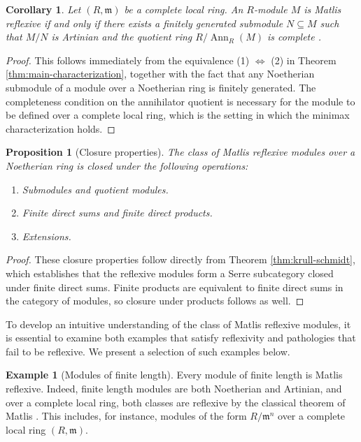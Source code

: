 \documentclass{kms-c}
\theoremstyle{plain}
\newtheorem{proposition}[theorem]{Proposition}
\newtheorem{corollary}[theorem]{Corollary}
\theoremstyle{definition}
\newtheorem{example}[theorem]{Example}
\theoremstyle{remark}
\begin{document}
\begin{corollary}
\label{cor:main}
Let \( (R, \mathfrak{m}) \) be a complete local ring. An \( R \)-module \( M \) is Matlis reflexive if and only if there exists a finitely generated submodule \( N \subseteq M \) such that \( M/N \) is Artinian and the quotient ring \( R/\operatorname{Ann}_R(M) \) is complete \cite[Theorem 3.1]{Matlis1958}.
\end{corollary}
\begin{proof}
This follows immediately from the equivalence (1) \(\Leftrightarrow\) (2) in Theorem \ref{thm:main-characterization}, together with the fact that any Noetherian submodule of a module over a Noetherian ring is finitely generated. The completeness condition on the annihilator quotient is necessary for the module to be defined over a complete local ring, which is the setting in which the minimax characterization holds. 
\end{proof}

\begin{proposition}[Closure properties]
\label{prop:closure}
The class of Matlis reflexive modules over a Noetherian ring is closed under the following operations:
\begin{enumerate}
\item Submodules and quotient modules.
\item Finite direct sums and finite direct products.
\item Extensions.
\end{enumerate}
\end{proposition}
\begin{proof}
These closure properties follow directly from Theorem \ref{thm:krull-schmidt}, which establishes that the reflexive modules form a Serre subcategory closed under finite direct sums. Finite products are equivalent to finite direct sums in the category of modules, so closure under products follows as well. 
\end{proof}

To develop an intuitive understanding of the class of Matlis reflexive modules, it is essential to examine both examples that satisfy reflexivity and pathologies that fail to be reflexive. We present a selection of such examples below.

\begin{example}[Modules of finite length]
Every module of finite length is Matlis reflexive. Indeed, finite length modules are both Noetherian and Artinian, and over a complete local ring, both classes are reflexive by the classical theorem of Matlis \cite{Matlis1958}. This includes, for instance, modules of the form \( R/\mathfrak{m}^n \) over a complete local ring \( (R, \mathfrak{m}) \).
\end{example}
\end{document}

